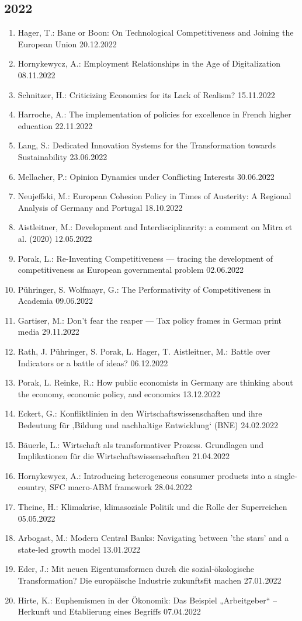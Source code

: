 \subsection*{2022}
\begin{enumerate}
	\item Hager, T.: Bane or Boon: On Technological Competitiveness and Joining the European Union 20.12.2022
	\item Hornykewycz, A.: Employment Relationships in the Age of Digitalization 08.11.2022
	\item Schnitzer, H.: Criticizing Economics for its Lack of Realism? 15.11.2022
	\item  Harroche, A.: The implementation of policies for excellence in French higher education 22.11.2022
	\item  Lang, S.: Dedicated Innovation Systems for the Transformation towards Sustainability 23.06.2022
	\item  Mellacher, P.: Opinion Dynamics under Conflicting Interests 30.06.2022
	\item  Neujeffski, M.: European Cohesion Policy in Times of Austerity: A Regional Analysis of Germany and Portugal 18.10.2022
	\item Aistleitner, M.: Development and Interdisciplinarity: a comment on Mitra et al. (2020) 12.05.2022
	\item Porak, L.: Re-Inventing Competitiveness — tracing the development of competitiveness as European governmental problem 02.06.2022
	\item Pühringer, S. Wolfmayr, G.: The Performativity of Competitiveness in Academia 09.06.2022
	\item  Gartiser, M.: Don’t fear the reaper — Tax policy frames in German print media 29.11.2022
	\item Rath, J. Pühringer, S. Porak, L. Hager, T. Aistleitner, M.: Battle over Indicators or a battle of ideas? 06.12.2022
	\item Porak, L. Reinke, R.: How public economists in Germany are thinking about the economy, economic policy, and economics 13.12.2022
	\item  Eckert, G.: Konfliktlinien in den Wirtschaftswissenschaften und ihre Bedeutung für ‚Bildung und nachhaltige Entwicklung‘ (BNE) 24.02.2022
	\item Bäuerle, L.: Wirtschaft als transformativer Prozess. Grundlagen und Implikationen für die Wirtschaftswissenschaften 21.04.2022
	\item Hornykewycz, A.: Introducing heterogeneous consumer products into a single-country, SFC macro-ABM framework 28.04.2022
	\item Theine, H.: Klimakrise, klimasoziale Politik und die Rolle der Superreichen 05.05.2022
	\item  Arbogast, M.: Modern Central Banks: Navigating between 'the stars' and a state-led growth model 13.01.2022
	\item Eder, J.: Mit neuen Eigentumsformen durch die sozial-ökologische Transformation? Die europäische Industrie zukunftsfit machen 27.01.2022
	\item Hirte, K.: Euphemismen in der Ökonomik: Das Beispiel „Arbeitgeber“ – Herkunft und Etablierung eines Begriffs 07.04.2022
\end{enumerate}
